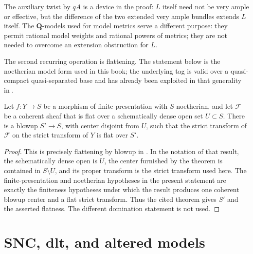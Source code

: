 \begin{remark}\label{rem:line-bundle-extension-twist}
The auxiliary twist by $qA$ is a device in the proof: $L$ itself need not
be very ample or effective, but the difference of the two extended very
ample bundles extends $L$ itself.  The $\mathbf Q$-models used for model
metrics serve a different purpose: they permit rational model weights and
rational powers of metrics; they are not needed to overcome an extension
obstruction for $L$.
\end{remark}

The second recurring operation is flattening.  The statement below is the
noetherian model form used in this book; the underlying tag is valid over a
quasi-compact quasi-separated base and has already been exploited in that
generality in .

\begin{theorem}\label{thm:flattening-models}
Let $f:Y\to S$ be a morphism of finite presentation with $S$ noetherian, and
let $\mathcal F$ be a coherent sheaf that is flat over a schematically dense
open set $U\subset S$. There is a blowup $S'\to S$, with center disjoint from
$U$, such that the strict transform of $\mathcal F$ on the strict transform
of $Y$ is flat over $S'$.
\end{theorem}
\begin{proof}
This is precisely flattening by blowup in
\cite[Tag 0815]{stacks-project}.  In the notation of that result, the
schematically dense open is $U$, the center furnished by the theorem is
contained in $S\setminus U$, and its proper transform is the strict
transform used here.  The finite-presentation and noetherian hypotheses in
the present statement are exactly the finiteness hypotheses under which the
result produces one coherent blowup center and a flat strict transform.
Thus the cited theorem gives $S'$ and the asserted flatness.  The different
domination statement \cite[Tag 081T]{stacks-project} is not used.
\end{proof}

\section{SNC, dlt, and altered models}

